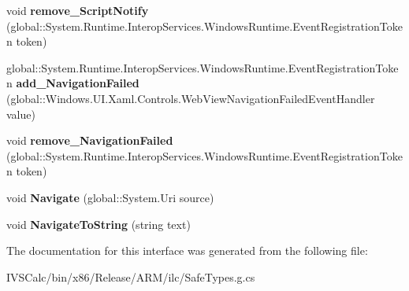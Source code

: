 \begin{DoxyCompactItemize}
void {\bfseries remove\+\_\+\+Script\+Notify} (global\+::\+System.\+Runtime.\+Interop\+Services.\+Windows\+Runtime.\+Event\+Registration\+Token token)
\item 
\mbox{\label{interface_windows_1_1_u_i_1_1_xaml_1_1_controls_1_1_i_web_view_ac5c8918c61695196369083e55461e2ae}} 
global\+::\+System.\+Runtime.\+Interop\+Services.\+Windows\+Runtime.\+Event\+Registration\+Token {\bfseries add\+\_\+\+Navigation\+Failed} (global\+::\+Windows.\+U\+I.\+Xaml.\+Controls.\+Web\+View\+Navigation\+Failed\+Event\+Handler value)
\item 
\mbox{\label{interface_windows_1_1_u_i_1_1_xaml_1_1_controls_1_1_i_web_view_a2701e74fa38f2b8566ba2ded21b4f20f}} 
void {\bfseries remove\+\_\+\+Navigation\+Failed} (global\+::\+System.\+Runtime.\+Interop\+Services.\+Windows\+Runtime.\+Event\+Registration\+Token token)
\item 
\mbox{\label{interface_windows_1_1_u_i_1_1_xaml_1_1_controls_1_1_i_web_view_ad6b51d8da7bbcb753718bf0fbdf993e9}} 
void {\bfseries Navigate} (global\+::\+System.\+Uri source)
\item 
\mbox{\label{interface_windows_1_1_u_i_1_1_xaml_1_1_controls_1_1_i_web_view_a5d3ada22753e211f63167cbea88d12f7}} 
void {\bfseries Navigate\+To\+String} (string text)
\end{DoxyCompactItemize}


The documentation for this interface was generated from the following file\+:\begin{DoxyCompactItemize}
\item 
I\+V\+S\+Calc/bin/x86/\+Release/\+A\+R\+M/ilc/Safe\+Types.\+g.\+cs\end{DoxyCompactItemize}
